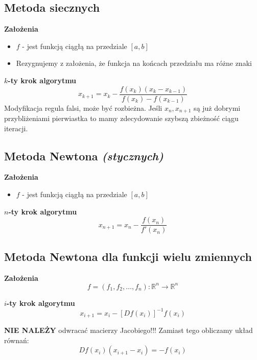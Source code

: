 \documentclass[../mn-notatki.tex]{subfiles}
\begin{document}
\subsection{Metoda siecznych}

\begin{tcolorbox}
\textbf{Założenia}
\begin{itemize}
    \item $f$ - jest funkcją ciągłą na przedziale $[a,b]$
    \item Rezygnujemy z założenia, że funkcja na końcach przedziału ma różne znaki\\
\end{itemize}

\textbf{$k$-ty krok algorytmu}
\[
x_{k+1} = x_k - \frac{f(x_k)(x_k - x_{k-1})}{f(x_k) - f(x_{k-1})}
\]
Modyfikacja regula falsi, może być rozbieżna. Jeśli $x_n, x_{n+1}$ są już
dobrymi przybliżeniami pierwiastka to mamy zdecydowanie szybszą zbieżność ciągu
iteracji.
\end{tcolorbox}

\subsection{Metoda Newtona \textit{(stycznych)}}

\begin{tcolorbox}
\textbf{Założenia}
\begin{itemize}
    \item $f$ - jest funkcją ciągłą na przedziale $[a,b]$
\end{itemize}

\textbf{$n$-ty krok algorytmu}
\[
x_{n+1} = x_n - \frac{f(x_n)}{f'(x_n)}
\]
\end{tcolorbox}


\subsection{Metoda Newtona dla funkcji wielu zmiennych}

\begin{tcolorbox}
\textbf{Założenia}
\[
f = (f_1, f_2, \ldots, f_n) : \mathbb{R}^n \rightarrow \mathbb{R}^n
\]

\textbf{$i$-ty krok algorytmu}
\[
x_{i+1} = x_i - \left[ D f(x_i) \right]^{-1} f(x_i)
\]

\textbf{NIE NALEŻY} odwracać macierzy Jacobiego!!!
Zamiast tego obliczamy układ równań:
\[
D f(x_i) (x_{i+1} - x_i) = -f(x_i)
\]
\end{tcolorbox}
\end{document}
